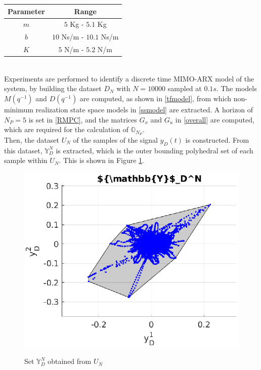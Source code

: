 \documentclass[letterpaper, 10 pt, conference]{ieeeconf}  %
\begin{document}
\begin{table}[h!]
	\hspace{50pt}
	\begin{tabular}{||c|c||} 
		\hline
		Parameter & Range\\ [0.5ex] 
		\hline\hline
		$m$ & $5$ Kg - $5.1$ Kg \\
		$b$ & $10$ Ns/m - $10.1$ Ns/m \\
		$K$ & $5$ N/m - $5.2$ N/m \\
		\hline
	\end{tabular}
	\label{Simparam}
	\vspace{-10pt}  
\end{table}\\
Experiments are performed to identify a discrete time MIMO-ARX model of the system, by building the dataset $D_N$ with $N=10000$ sampled at $0.1s$. The models $M(q^{-1})$ and $D(q^{-1})$ are computed, as shown in \eqref{tfmodel}, from which non-minimum realization state space models in \eqref{ssmodel} are extracted. A horizon of $N_P=5$ is set in \eqref{RMPC}, and the matrices $G_x$ and $G_u$ in \eqref{overall} are computed, which are required for the calculation of $\mathbb{O}_{N_P}$.
\\
Then, the dataset $U_N$ of the samples of the signal $y_D(t)$ is constructed. From this dataset, $\mathbb{Y}_D^N$ is extracted, which is the outer bounding polyhedral set of each sample within $U_N$. This is shown in Figure \ref{Y_D^inf}.
	\begin{figure}[t]
		\vspace{-3pt}
		\hspace{30pt}
		\includegraphics[scale=0.7]{Y_D_set.eps}
		\label{Y_D^inf}
		\caption{Set $\mathbb{Y}_D^N$ obtained from $U_N$}
	\end{figure} \\
\end{document}
